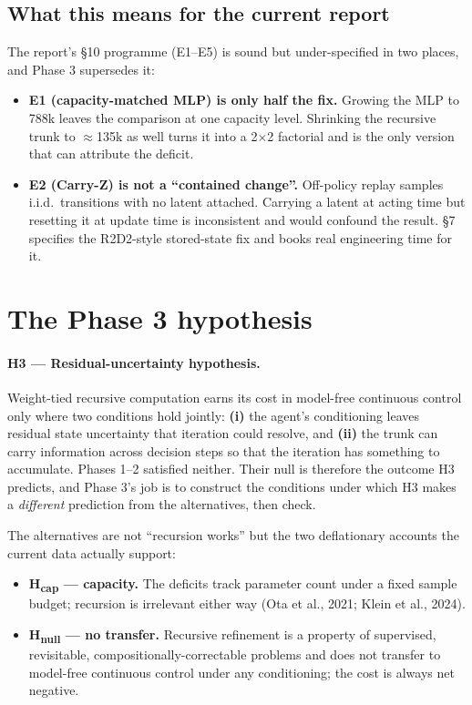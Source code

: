 \documentclass[11pt]{article}
\begin{document}
\subsection{What this means for the current report}

The report's \S10 programme (E1--E5) is sound but under-specified in two places, and Phase 3 supersedes it:

\begin{itemize}[leftmargin=1.4em]
\item \textbf{E1 (capacity-matched MLP) is only half the fix.} Growing the MLP to 788k leaves the comparison at one capacity level. Shrinking the recursive trunk to $\approx$135k as well turns it into a 2$\times$2 factorial and is the only version that can attribute the deficit.
\item \textbf{E2 (Carry-Z) is not a ``contained change''.} Off-policy replay samples i.i.d.\ transitions with no latent attached. Carrying a latent at acting time but resetting it at update time is inconsistent and would confound the result. \S7 specifies the R2D2-style stored-state fix and books real engineering time for it.
\end{itemize}

\section{The Phase 3 hypothesis}

\paragraph{H3 --- Residual-uncertainty hypothesis.} Weight-tied recursive computation earns its cost in model-free continuous control only where two conditions hold jointly: \textbf{(i)} the agent's conditioning leaves residual state uncertainty that iteration could resolve, and \textbf{(ii)} the trunk can carry information across decision steps so that the iteration has something to accumulate. Phases 1--2 satisfied neither. Their null is therefore the outcome H3 predicts, and Phase 3's job is to construct the conditions under which H3 makes a \emph{different} prediction from the alternatives, then check.

The alternatives are not ``recursion works'' but the two deflationary accounts the current data actually support:

\begin{itemize}[leftmargin=1.4em]
\item \textbf{H\textsubscript{cap} --- capacity.} The deficits track parameter count under a fixed sample budget; recursion is irrelevant either way (Ota et al., 2021; Klein et al., 2024).
\item \textbf{H\textsubscript{null} --- no transfer.} Recursive refinement is a property of supervised, revisitable, compositionally-correctable problems and does not transfer to model-free continuous control under any conditioning; the cost is always net negative.
\end{itemize}
\end{document}
